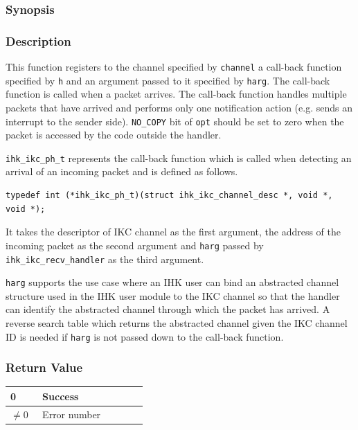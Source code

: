 \documentclass[twoside,11pt,fleqn]{book}
\begin{document}
\subsubsection*{Synopsis}{\quad}
\subsubsection*{Description}{\quad}
This function registers to the channel specified by \texttt{channel} a call-back function specified by \texttt{h} and an argument passed to it specified by \texttt{harg}. The call-back function is called when a packet arrives.
The call-back function handles multiple packets that have arrived and performs only one notification action (e.g. sends an interrupt to the sender side).
\texttt{NO\_COPY} bit of \texttt{opt} should be set to zero when the packet is accessed by the code outside the handler.

{\tt ihk\_ikc\_ph\_t} represents the call-back function which is called when detecting an arrival of an incoming packet and is defined as follows.
\begin{verbatim}
typedef int (*ihk_ikc_ph_t)(struct ihk_ikc_channel_desc *, void *, void *);
\end{verbatim}
It takes the descriptor of IKC channel as the first argument, the address of the incoming packet as the second argument and \texttt{harg} passed by \texttt{ihk\_ikc\_recv\_handler} as the third argument.

\texttt{harg} supports the use case where an IHK user can bind an abstracted channel structure used in the IHK user module to the IKC channel so that the handler can identify the abstracted channel through which the packet has arrived.
A reverse search table which returns the abstracted channel given the IKC channel ID is needed if \texttt{harg} is not passed down to the call-back function.

\subsubsection*{Return Value}{\quad}
\begin{table}[!h]
\footnotesize
\begin{tabular}{|p{0.20\linewidth}|p{0.66\linewidth}|} \hline
0&Success\\ \hline
$\ne 0$&Error number\\ \hline
\end{tabular}
\vspace{-0em}
\end{table}
\FloatBarrier
\end{document}
